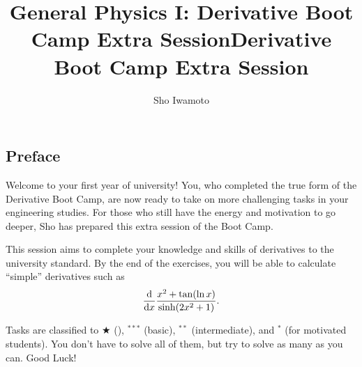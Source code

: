 \documentclass[11pt,pdfa,lastpage]{MishoNote}
\title{General Physics I: Derivative Boot Camp Extra Session}
\author{Sho Iwamoto}
\let\origfootnote\footnote
\let\origfootnoterule\footnoterule
\begin{document}
%
\title{Derivative Boot Camp Extra Session}\begin{maketitle}
\let\footnote\origfootnote
\let\footnoterule\origfootnoterule

\subsection*{Preface}
Welcome to your first year of university!
You, who completed the true form of the Derivative Boot Camp, are now ready to take on more challenging tasks in your engineering studies.
For those who still have the energy and motivation to go deeper, Sho has prepared this extra session of the Boot Camp.

This session aims to complete your knowledge and skills of derivatives to the university standard.
By the end of the exercises, you will be able to calculate ``simple'' derivatives such as
\[
\diff{}{x}\frac{x^2+\tan(\ln x)}{\sinh(2x^2+1)}.
\]


Tasks are classified to $\bigstar$ (), $^{***}$ (basic), $^{**}$ (intermediate), and $^{*}$ (for motivated students).
You don't have to solve all of them, but try to solve as many as you can.
Good Luck!

\enlargethispage{-5em}

\makeatletter
{}
\makeatother

\end{maketitle}
\newpage
\end{document}
